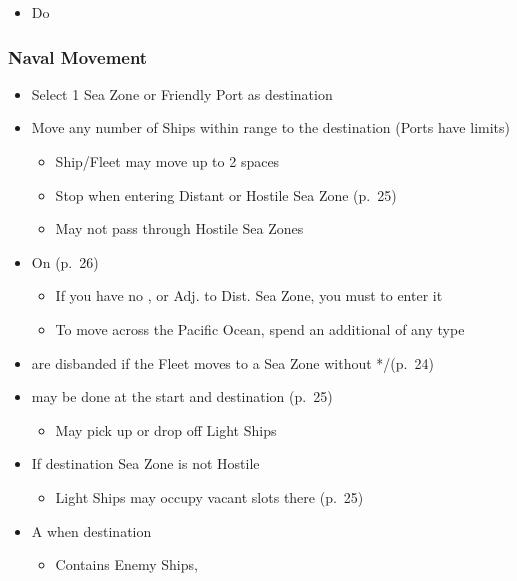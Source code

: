 \documentclass[10pt]{article}
\begin{document}
\begin{itemize}
	\item Do   
\end{itemize}
\subsubsection*{Naval Movement}
\begin{itemize}
	\item Select 1 Sea Zone or Friendly Port as destination
	\item Move any number of Ships within range to the destination (Ports have limits)
	\begin{itemize}
		\item Ship/Fleet may move up to 2 spaces
		\item Stop when entering Distant or Hostile Sea Zone (p.~25)
		\item May not pass through Hostile Sea Zones
	\end{itemize}
	\item On  (p.~26)
	\begin{itemize}
		\item If you have no \claim, \town or \vassal Adj. to Dist. Sea Zone, you must  to enter it
		\item To move across the Pacific Ocean, spend an additional \monarchpower of any type
	\end{itemize}
	\item {} are disbanded if the Fleet moves to a Sea Zone without */\textdagger\xspace(p.~24)
	\item {} may be done at the start and destination (p.~25)
	\begin{itemize}
		\item May pick up or drop off Light Ships
	\end{itemize}
	\item If destination Sea Zone is not Hostile
	\begin{itemize}
		\item Light Ships may occupy vacant  slots there (p. 25)
	\end{itemize}
	\item A  when destination
	\begin{itemize}
		\item Contains Enemy Ships, 

\end{itemize}
\end{itemize}
\end{document}
